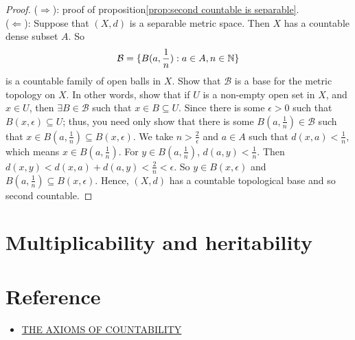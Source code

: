 \begin{proof}
    ($\Rightarrow$): proof of proposition\ref{prop:second countable is separable}.\\
    ($\Leftarrow$): Suppose that $(X,d)$ is a separable metric space. Then $X$ has a countable dense subset $A$.
    So
    \begin{align*}
        \mathcal{B} = \{B(a,\frac{1}{n}):a\in A, n\in \mathbb{N}\}
    \end{align*} 
    is a countable family of open balls in $X$.
    Show that $\mathcal{B}$ is a base for the metric topology on $X$.
    In other words, show that if $U$ is a non-empty open set in $X$, and $x\in U$, then $\exists B\in \mathcal{B}$
    such that $x\in B\subseteq U$. 
    Since there is some $\epsilon>0$ such that $B(x,\epsilon)\subseteq U$;
    thus, you need only show that there is some $B(a,\frac{1}{n})\in \mathcal{B}$
    such that $x\in B(a,\frac{1}{n})\subseteq B(x,\epsilon)$.
    We take $n>\frac{2}{\epsilon}$ and $a\in A$ such that $d(x,a)<\frac{1}{n}$, which means $x\in B(a,\frac{1}{n})$.
    For $y\in B(a,\frac{1}{n})$, $d(a,y)<\frac{1}{n}$. Then $d(x,y)<d(x,a)+d(a,y)<\frac{2}{n}<\epsilon$. So $y\in B(x,\epsilon)$ and $B(a,\frac{1}{n})\subseteq B(x,\epsilon)$.
    Hence, $(X,d)$ has a countable topological base and so second countable.
\end{proof}



\section{Multiplicability and heritability}



\section{Reference}
\begin{itemize}
    \item \href{http://staff.ustc.edu.cn/~wangzuoq/Courses/21S-Topology/Notes/Lec13.pdf}{THE AXIOMS OF COUNTABILITY}
\end{itemize}


